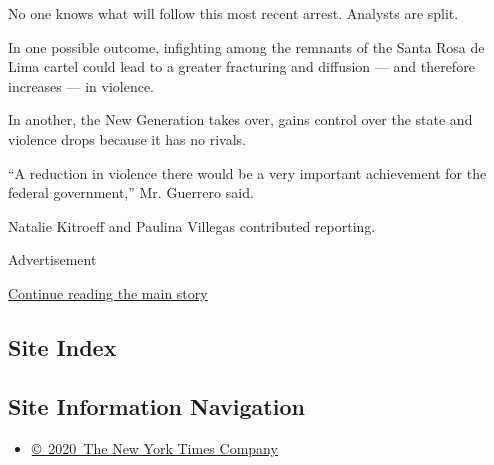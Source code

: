 No one knows what will follow this most recent arrest. Analysts are
split.

In one possible outcome, infighting among the remnants of the Santa Rosa
de Lima cartel could lead to a greater fracturing and diffusion --- and
therefore increases --- in violence.

In another, the New Generation takes over, gains control over the state
and violence drops because it has no rivals.

``A reduction in violence there would be a very important achievement
for the federal government,'' Mr. Guerrero said.

Natalie Kitroeff and Paulina Villegas contributed reporting.

Advertisement

\protect\hyperlink{after-bottom}{Continue reading the main story}

\hypertarget{site-index}{%
\subsection{Site Index}\label{site-index}}

\hypertarget{site-information-navigation}{%
\subsection{Site Information
Navigation}\label{site-information-navigation}}

\begin{itemize}
\tightlist
\item
  \href{https://help.nytimes3xbfgragh.onion/hc/en-us/articles/115014792127-Copyright-notice}{©~2020~The
  New York Times Company}
\end{itemize}


